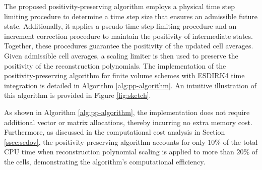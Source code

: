 The proposed positivity-preserving algorithm employs a physical time step limiting procedure to determine a time step size that ensures an admissible future state. Additionally, it applies a pseudo time step limiting procedure and an increment correction procedure to maintain the positivity of intermediate states. Together, these procedures guarantee the positivity of the updated cell averages. Given admissible cell averages, a scaling limiter is then used to preserve the positivity of the reconstruction polynomials.
The implementation of the positivity-preserving algorithm for finite volume schemes with ESDIRK4 time integration is detailed in Algorithm \ref{alg:pp-algorithm}. An intuitive illustration of this algorithm is provided in Figure \ref{fig:sketch}.

As shown in Algorithm \ref{alg:pp-algorithm}, the implementation does not require additional vector or matrix allocations, thereby incurring no extra memory cost. Furthermore, as discussed in the computational cost analysis in Section \ref{ssec:sedov}, the positivity-preserving algorithm accounts for only $10\%$ of the total CPU time when reconstruction polynomial scaling is applied to more than $20\%$ of the cells, demonstrating the algorithm’s computational efficiency.





